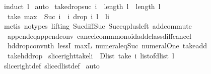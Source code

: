 \begin{isabellebody}
\ {\isacharparenleft}induct\ l{\isacharparenright}\isanewline
{}\isamarkupfalse%
\ auto%
\endisatagproof
{\isafoldproof}%
%
\isadelimproof
\isanewline
%
\endisadelimproof
\isanewline
{}\isamarkupfalse%
\ take{\isacharunderscore}drop{\isacharunderscore}suc{\isacharcolon}\ {\isachardoublequoteopen}i\ {\isacharless}\ length\ l\ {\isasymLongrightarrow}\ length\ l\ {\isachargreater}\ {}\ {\isasymLongrightarrow}\ \isanewline
\ \ take\ {\isacharparenleft}max\ {}\ {\isacharparenleft}{\isacharparenleft}Suc\ i{\isacharparenright}\ {\isacharminus}\ i{\isacharparenright}{\isacharparenright}\ {\isacharparenleft}drop\ i\ l{\isacharparenright}\ {\isacharequal}\ {\isacharbrackleft}l{\isacharbang}i{\isacharbrackright}{\isachardoublequoteclose}\isanewline
%
\isadelimproof
%
\endisadelimproof
%
\isatagproof
{}\isamarkupfalse%
\ {\isacharparenleft}metis\ {\isacharparenleft}no{\isacharunderscore}types{\isacharcomma}\ lifting{\isacharparenright}\ Suc{\isacharunderscore}diff{\isacharunderscore}Suc\ Suc{\isacharunderscore}eq{\isacharunderscore}plus{}{\isacharunderscore}left\ add{\isachardot}commute\ \isanewline
\ \ append{\isacharunderscore}eq{\isacharunderscore}append{\isacharunderscore}conv\ cancel{\isacharunderscore}comm{\isacharunderscore}monoid{\isacharunderscore}add{\isacharunderscore}class{\isachardot}diff{\isacharunderscore}cancel\ \isanewline
\ \ hd{\isacharunderscore}drop{\isacharunderscore}conv{\isacharunderscore}nth\ lessI\ max{\isacharunderscore}{}L\ numeral{\isacharunderscore}{}{\isacharunderscore}eq{\isacharunderscore}Suc{\isacharunderscore}{}\ numeral{\isacharunderscore}One\ take{\isacharunderscore}add\ \isanewline
\ \ take{\isacharunderscore}hd{\isacharunderscore}drop{\isacharparenright}%
\endisatagproof
{\isafoldproof}%
%
\isadelimproof
\isanewline
%
\endisadelimproof
\isanewline
{}\isamarkupfalse%
\ slice{\isacharunderscore}right{\isacharunderscore}take{\isacharcolon}{\isachardoublequoteopen}l{\isasymdagger}{\isachardot}{\isachardot}i\ {\isacharequal}\ Dlist\ {\isacharparenleft}take\ i\ {\isacharparenleft}list{\isacharunderscore}of{\isacharunderscore}dlist\ l{\isacharparenright}{\isacharparenright}{\isachardoublequoteclose}\isanewline
%
\isadelimproof
%
\endisadelimproof
%
\isatagproof
{}\isamarkupfalse%
\ slice{\isacharunderscore}right{\isacharunderscore}def\ slice{\isacharunderscore}dlist{\isacharunderscore}def\isanewline
{}\isamarkupfalse%
\ auto%
\endisatagproof
{\isafoldproof}%
%
\isadelimproof

\end{isabellebody}
